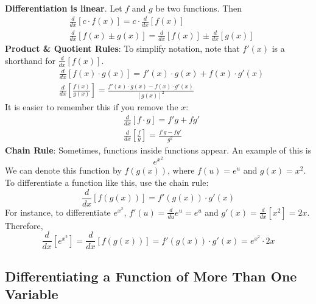 \textbf{Differentiation is linear}. Let $f$ and $g$ be two functions. Then 
\begin{equation*}
    \begin{aligned}
        &\frac{d}{dx} [c \cdot f(x)] = c \cdot \frac{d}{dx} [f(x)] \\ 
        &\frac{d}{dx} [f(x) \pm g(x)] = \frac{d}{dx} [f(x)] \pm \frac{d}{dx} [g(x)]
    \end{aligned}
\end{equation*}
\textbf{Product \& Quotient Rules}: 
To simplify notation, note that $f'(x)$ is a shorthand for $\frac{d}{dx} [f(x)]$.
\begin{equation*}
    \begin{aligned}
        &\frac{d}{dx} [f(x) \cdot g(x)] = f'(x) \cdot g(x) + f(x) \cdot g'(x) \\ 
        &\frac{d}{dx} \left[\frac{f(x)}{g(x)}\right] = \frac{f'(x) \cdot g(x) - f(x) \cdot g'(x)}{[g(x)]^2}
    \end{aligned}
\end{equation*}
It is easier to remember this if you remove the $x$:
\begin{equation*}
    \begin{aligned}
        &\frac{d}{dx} [f \cdot g] = f'  g + f  g' \\ 
        &\frac{d}{dx} \left[\frac{f}{g}\right] = \frac{f'  g - f  g'}{g^2}
    \end{aligned}
\end{equation*}
\textbf{Chain Rule}: Sometimes, functions inside functions appear. An example of this is 
\begin{equation*}
    e^{x^2}
\end{equation*}
We can denote this function by $f(g(x))$, where $f(u) = e^u$ and $g(x) = x^2$. To differentiate 
a function like this, use the chain rule:
\begin{equation*}
    \frac{d}{dx} [f(g(x))] = f'(g(x)) \cdot g'(x)
\end{equation*}
For instance, to differentiate $e^{x^2}$, $f'(u) = \frac{d}{du} e^u = e^u$ and 
$g'(x) = \frac{d}{dx} \left[x^2\right] = 2x$. Therefore, 
\begin{equation*}
    \frac{d}{dx} \left[e^{x^2}\right] = \frac{d}{dx} [f(g(x))] = f'(g(x)) \cdot g'(x) = e^{x^2} \cdot 2x
\end{equation*}

\subsection{Differentiating a Function of More Than One Variable}

